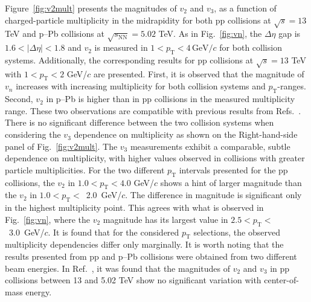 Figure~\ref{fig:v2mult} presents the magnitudes of $v_2$ and $v_3$, as a function of charged-particle multiplicity in the midrapidity for both pp collisions at $\sqrt{s}=13$ TeV and p--Pb collisions at $\sqrt{s_\mathrm{NN}}=5.02$ TeV. As in Fig.~\ref{fig:vn}, the $\Delta\eta$ gap is $1.6<|\Delta\eta|<1.8$ and $v_2$ is measured in $1<p_{\mathrm{T}}<4\,\mathrm{GeV}/c$ for both collision systems. Additionally, the corresponding results for pp collisions at $\sqrt{s}=13$ TeV with $1<p_{\mathrm{T}}<2$ GeV/$c$ are presented. First, it is observed that the magnitude of $v_n$ increases with increasing multiplicity for both collision systems and $p_\mathrm{T}$-ranges. Second, $v_2$ in p--Pb is higher than in pp collisions in the measured multiplicity range. These two observations are compatible with previous results from Refs.~\cite{ATLAS:2015hzw,ATLAS:2016yzd, Khachatryan:2015lva}. There is no significant difference between the two collision systems when considering the $v_3$ dependence on multiplicity as shown on the Right-hand-side panel of Fig.~\ref{fig:v2mult}. The $v_3$ measurements exhibit a comparable, subtle dependence on multiplicity, with higher values observed in collisions with greater particle multiplicities.
For the two different $p_\mathrm{T}$ intervals presented for the pp collisions, the $v_2$ in $1.0<p_\mathrm{T}<4.0$ GeV/$c$ shows a hint of larger magnitude than the $v_2$ in $1.0<p_\mathrm{T}<$~2.0~GeV/$c$. The difference in magnitude is significant only in the highest multiplicity point. 
This agrees with what is observed in Fig.~\ref{fig:vn}, where the $v_2$ magnitude has its largest value in $2.5<p_\mathrm{T}<$~3.0~GeV/$c$. It is found that for the considered $p_\mathrm{T}$ selections, the observed multiplicity dependencies differ only marginally. 
It is worth noting that the results presented from pp and p--Pb collisions were obtained from two different beam energies. In Ref.~\cite{ATLAS:2016yzd}, it was found that the magnitudes of $v_2$ and $v_3$ in pp collisions between 13 and 5.02 TeV show no significant variation with center-of-mass energy.

